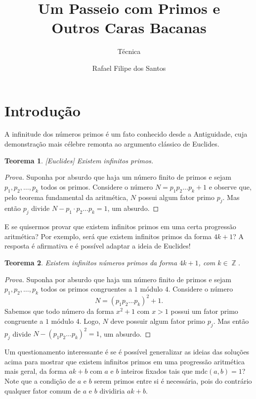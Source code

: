 \documentclass{hipatia}
\title{Um Passeio com Primos e \\ Outros Caras Bacanas}
\subtitle{Técnica}
\author{Rafael Filipe dos Santos}
\DeclareMathOperator{\Z}{\mathbb{Z}}
\newtheorem{theorem*}{Teorema}
\begin{document}
\setcounter{page}{\tecnicapage}
\maketitle

\section{Introdução}

A infinitude dos números primos é um fato conhecido desde a Antiguidade, cuja demonstração mais célebre remonta ao argumento clássico de Euclides.

\begin{theorem*}\label{thm:euclides}[Euclides] Existem infinitos primos.
\end{theorem*}

\begin{proof}[Prova]
Suponha por absurdo que haja um número finito de primos e sejam $p_1, p_2, \ldots, p_k$ todos os primos. Considere o número $N=p_1p_2\ldots p_k + 1$ e observe que, pelo teorema fundamental da aritmética, $N$ possui algum fator primo $p_j$. Mas então $p_j$ divide $N-p_1\cdot p_2 \ldots p_k = 1$, um absurdo.    
\end{proof}

E se quisermos provar que existem infinitos primos em uma certa progressão aritmética? Por exemplo, será que existem infinitos primos da forma $4k+1$? A resposta é afirmativa e é possível adaptar a ideia de Euclides!

\begin{theorem*}\label{thm:4k+1}
Existem infinitos números primos da forma $4k+1$, com $k \in \Z$.
\end{theorem*}

\begin{proof}[Prova]
Suponha por absurdo que haja um número finito de primos e sejam $p_1, p_2, \ldots, p_k$ todos os primos congruentes a $1$ módulo $4$. Considere o número
\[N=(p_1p_2\ldots p_k)^2 + 1.\]
Sabemos que todo número da forma $x^2+1$ com $x>1$ possui um fator primo congruente a $1$ módulo $4$. Logo, $N$ deve possuir algum fator primo $p_j$. Mas então $p_j$ divide $N-(p_1p_2\ldots p_k)^2=1$, um absurdo.
\end{proof}

Um questionamento interessante é se é possível generalizar as ideias das soluções acima para mostrar que existem infinitos primos em uma progressão aritmética mais geral, da forma $ak+b$ com $a$ e $b$ inteiros fixados tais que $\text{mdc}(a,b)=1$? Note que a condição de $a$ e $b$ serem primos entre si é necessária, pois do contrário qualquer fator comum de $a$ e $b$ dividiria $ak+b$.
\end{document}
